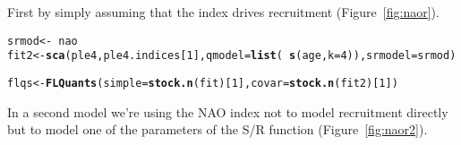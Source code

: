 \documentclass[a4paper,english,10pt]{article}\usepackage[]{graphicx}\usepackage[]{color}
\makeatletter
\newcommand{\hlnum}[1]{\textcolor[rgb]{0.686,0.059,0.569}{#1}}%
\newcommand{\hlopt}[1]{\textcolor[rgb]{0,0,0}{#1}}%
\newcommand{\hlstd}[1]{\textcolor[rgb]{0.345,0.345,0.345}{#1}}%
\newcommand{\hlkwb}[1]{\textcolor[rgb]{0.69,0.353,0.396}{#1}}%
\newcommand{\hlkwc}[1]{\textcolor[rgb]{0.333,0.667,0.333}{#1}}%
\newcommand{\hlkwd}[1]{\textcolor[rgb]{0.737,0.353,0.396}{\textbf{#1}}}%
\newenvironment{kframe}{%
 \def\at@end@of@kframe{}%
 \ifinner\ifhmode%
  \def\at@end@of@kframe{\end{minipage}}%
  \begin{minipage}{\columnwidth}%
 \fi\fi%
 \def\FrameCommand##1{\hskip\@totalleftmargin \hskip-\fboxsep
 \colorbox{shadecolor}{##1}\hskip-\fboxsep
     \hskip-\linewidth \hskip-\@totalleftmargin \hskip\columnwidth}%
 \MakeFramed {\advance\hsize-\width
   \@totalleftmargin\z@ \linewidth\hsize
   \@setminipage}}%
 {\par\unskip\endMakeFramed%
 \at@end@of@kframe}
\newenvironment{knitrout}{}{} %
\makeatother
\begin{document}
First by simply assuming that the index drives recruitment (Figure~\ref{fig:naor}).

\begin{knitrout}
\color{fgcolor}\begin{kframe}
\begin{alltt}
\hlstd{srmod} \hlkwb{<-} \hlopt{~} \hlstd{nao}
\hlstd{fit2} \hlkwb{<-} \hlkwd{sca}\hlstd{(ple4, ple4.indices[}\hlnum{1}\hlstd{],} \hlkwc{qmodel}\hlstd{=}\hlkwd{list}\hlstd{(}\hlopt{~}\hlkwd{s}\hlstd{(age,} \hlkwc{k}\hlstd{=}\hlnum{4}\hlstd{)),} \hlkwc{srmodel}\hlstd{=srmod)}
\end{alltt}


{\ttfamily\noindent\bfseries{}}\begin{alltt}
\hlstd{flqs} \hlkwb{<-} \hlkwd{FLQuants}\hlstd{(}\hlkwc{simple}\hlstd{=}\hlkwd{stock.n}\hlstd{(fit)[}\hlnum{1}\hlstd{],} \hlkwc{covar}\hlstd{=}\hlkwd{stock.n}\hlstd{(fit2)[}\hlnum{1}\hlstd{])}
\end{alltt}


{\ttfamily\noindent\bfseries{}}\end{kframe}
\end{knitrout}

\begin{knitrout}
\color{fgcolor}\begin{kframe}


{\ttfamily\noindent\bfseries{}}\end{kframe}
\end{knitrout}

In a second model we're using the NAO index not to model recruitment directly but to model one of the parameters of the S/R function (Figure~\ref{fig:naor2}). 
\end{document}
